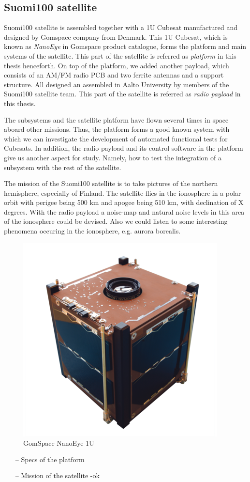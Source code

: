 \documentclass[english,12pt,a4paper,pdftex,elec,utf8]{aaltothesis}
\begin{document}
\subsection{Suomi100 satellite}
Suomi100 satellite is assembled together with a 1U Cubesat manufactured and designed by Gomspace company from Denmark. This 1U Cubesat, which is known as \textit{NanoEye} in Gomspace product catalogue, forms the platform and main systems of the satellite. This part of the satellite is referred as \textit{platform} in this thesis henceforth. On top of the platform, we added another payload, which consists of an AM/FM radio PCB and two ferrite antennas and a support structure. All designed an assembled in Aalto University by members of the Suomi100 satellite team. This part of the satellite is referred as \textit{radio payload} in this thesis.\par
The subsystems and the satellite platform have flown several times in space aboard other missions. Thus, the platform forms a good known system with which we can investigate the development of automated functional tests for Cubesats. In addition, the radio payload and its control software in the platform give us another aspect for study. Namely, how to test the integration of a subsystem with the rest of the satellite.\par
The mission of the Suomi100 satellite is to take pictures of the northern hemisphere, especially of Finland. The satellite flies in the ionosphere in a polar orbit with perigee being 500 km and apogee being 510 km, with declination of X degrees. With the radio payload a noise-map and natural noise levels in this area of the ionosphere could be devised. Also we could listen to some interesting phenomena occuring in the ionosphere, e.g. aurora borealis.
\begin{center}


\begin{figure}[h!]
\caption{GomSpace NanoEye 1U}
\includegraphics[scale=0.5]{nanoeye}
\end{figure}
\end{center}
\begin{itemize}
\item[--]Specs of the platform
\item[--]Mission of the satellite -ok
\end{itemize} 
\end{document}
